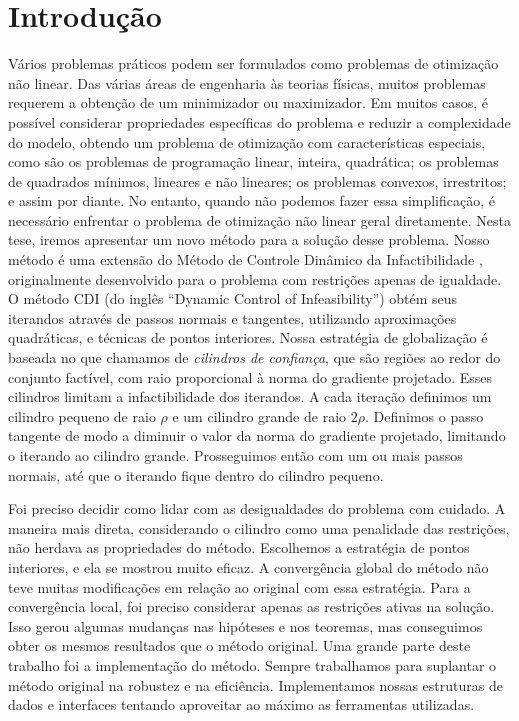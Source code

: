 \chapter{Introdução}

Vários problemas práticos podem ser formulados como problemas de otimização não
linear. Das várias áreas de engenharia às teorias físicas, muitos problemas
requerem a obtenção de um minimizador ou maximizador. 
Em muitos casos, é possível considerar propriedades específicas do problema e
reduzir a complexidade do modelo, obtendo um problema de otimização com
características especiais, como são os problemas de programação linear, inteira,
quadrática; os problemas de quadrados mínimos, lineares e não lineares; os
problemas convexos, irrestritos; e assim por diante.
No entanto, quando não podemos fazer essa simplificação, é necessário enfrentar
o problema de otimização não linear geral diretamente. Nesta tese, iremos
apresentar um novo método para a solução desse problema.
Nosso método é uma extensão do Método de Controle Dinâmico da
Infactibilidade \cite{bib:chico-dci}, originalmente desenvolvido para o problema
com restrições apenas de igualdade.
O método CDI (do inglês ``Dynamic Control of Infeasibility'') obtém seus
iterandos através de passos normais e tangentes, utilizando aproximações
quadráticas, e técnicas de pontos interiores.
Nossa estratégia de globalização é baseada no que chamamos de \emph{cilindros de
confiança}, que são regiões ao redor do conjunto factível, com raio proporcional
à norma do gradiente projetado.
Esses cilindros limitam a infactibilidade dos iterandos. 
A cada iteração definimos um cilindro pequeno de raio $\rho$ e um cilindro
grande de raio $2\rho$.
Definimos o passo tangente de modo a diminuir o valor da norma do gradiente
projetado, limitando o iterando ao cilindro grande. Prosseguimos então com um ou
mais passos normais, até que o iterando fique dentro do cilindro pequeno. 

Foi preciso decidir como lidar com as desigualdades do problema com cuidado. A
maneira mais direta, considerando o cilindro como uma penalidade das restrições,
não herdava as propriedades do método. 
Escolhemos a estratégia de pontos interiores, e ela se mostrou muito eficaz. A
convergência global do método não teve muitas modificações em relação ao
original com essa estratégia. Para a convergência local, foi preciso considerar
apenas as restrições ativas na solução. Isso gerou algumas mudanças nas
hipóteses e nos teoremas, mas conseguimos obter os mesmos resultados que o
método original.
Uma grande parte deste trabalho foi a implementação do método.
Sempre trabalhamos para suplantar o método original na robustez e na eficiência.
Implementamos nossas estruturas de dados e interfaces tentando aproveitar ao
máximo as ferramentas utilizadas.

